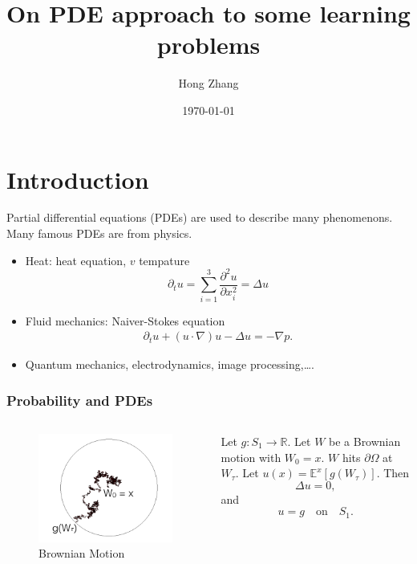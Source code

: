 \documentclass{beamer}
\title[prediction and learning]{On PDE approach to some learning problems} %
\author{Hong Zhang} %
\institute[Brown University] %
{
Applied Math, Brown University \\ %
\medskip
}
\date{\today} %
\begin{document}
\begin{frame}
\titlepage
\end{frame}
\begin{frame}
\tableofcontents
\end{frame}

\section{Introduction}

\begin{frame}
Partial differential equations (PDEs) are used to describe many phenomenons.  Many famous PDEs are from physics.
\begin{itemize}
\item Heat: heat equation, $v$ tempature
\begin{equation*}
\partial_t u = \sum_{i=1}^3\frac{\partial^2 u }{\partial x_i^2} = \Delta u
\end{equation*}
\pause
\item Fluid mechanics: Naiver-Stokes equation
\begin{align*}
\partial_t u + (u\cdot\nabla)u - \Delta u = -\nabla p.
\end{align*}
\pause
\item Quantum mechanics, electrodynamics, image processing,\ldots.
\end{itemize} 


\end{frame}

\begin{frame}
\frametitle{Probability and PDEs}
\begin{columns}
\begin{figure}
\includegraphics[scale = 0.3]{bmotion.png}
\caption{Brownian Motion}
\end{figure}
Let $g:S_1 \rightarrow \mathbb{R}$. Let $W$ be a Brownian motion with $W_0 = x$. $W$ hits $\partial \Omega$ at $W_{\tau}$. Let $u(x) = \mathbb{E}^x[g(W_\tau)]$.
Then $$\Delta u = 0,$$ 
and $$u = g\quad \text{on}\quad S_1.$$


\end{columns}
\end{frame}
\end{document}
